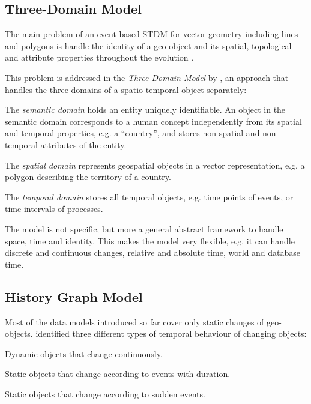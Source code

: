 
\subsection{Three-Domain Model} %
\label{sub:three_domain_model}

The main problem of an event-based STDM for vector geometry including lines and polygons is handle the identity of a geo-object and its spatial, topological and attribute properties throughout the evolution
\cite{yuan96temporal}.

This problem is addressed in the \emph{Three-Domain Model} by \cite{yuan96threedomain}, an approach that handles the three domains of a spatio-temporal object separately:
\begin{compactitem}
  \item The \emph{semantic domain} holds an entity uniquely identifiable. An object in the semantic domain corresponds to a human concept independently from its spatial and temporal properties, e.g. a ``country'', and stores non-spatial and non-temporal attributes of the entity.
  \item The \emph{spatial domain} represents geospatial objects in a vector representation, e.g. a polygon describing the territory of a country.
  \item The \emph{temporal domain} stores all temporal objects, e.g. time points of events, or time intervals of processes.
\end{compactitem}

The model is not specific, but more a general abstract framework to handle space, time and identity. This makes the model very flexible, e.g. it can handle discrete and continuous changes, relative and absolute time, world and database time.


\subsection{History Graph Model} %
\label{sub:history_graph_model}

Most of the data models introduced so far cover only static changes of geo-objects. \cite{key} identified three different types of temporal behaviour of changing objects:
\begin{compactitem}
  \item Dynamic objects that change continuously.
  \item Static objects that change according to events with duration.
  \item Static objects that change according to sudden events.
\end{compactitem}

